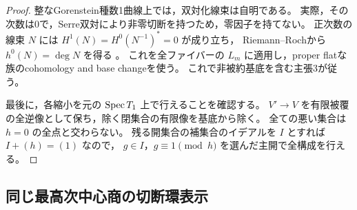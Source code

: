 \begin{proof}
整なGorenstein種数1曲線上では，双対化線束は自明である。
実際，その次数は0で，Serre双対により非零切断を持つため，零因子を持てない。
正次数の線束 $N$ には $H^1(N)=H^0(N^{-1})^*=0$ が成り立ち，
Riemann--Rochから $h^0(N)=\deg N$ を得る
\cite[Tag 0BS6]{StacksProject}。
これを全ファイバーの $L_m$ に適用し，proper flatな族のcohomology and base changeを使う。
これで非被約基底を含む主張3が従う。

最後に，各縮小を元の $\operatorname{Spec} T_1$ 上で行えることを確認する。
$V'\to V$ を有限被覆の全逆像として保ち，除く閉集合の有限像を基底から除く。
全ての悪い集合は $h=0$ の全点と交わらない。
残る開集合の補集合のイデアルを $I$ とすれば $I+(h)=(1)$ なので，
$g\in I$，$g\equiv1\pmod h$ を選んだ主開で全構成を行える。
\end{proof}

\subsection{同じ最高次中心商の切断環表示}

